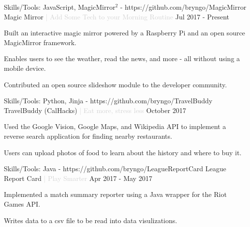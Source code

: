 

\begin{cventries}

  \cventry
  {Skills/Tools: JavaScript, MagicMirror$^2$ - https://github.com/bryngo/MagicMirror} %
  {Magic Mirror \textcolor{lightgray}{| Add Some Tech to your Morning Routine}} %
  {} %
  {Jul 2017 - Present} %
  {
  \begin{cvitems} %
    \item {Built an interactive magic mirror powered by a Raspberry Pi and an open source MagicMirror framework.}
    \item {Enables users to see the weather, read the news, and more - all without using a mobile device.}
    \item {Contributed an open source slideshow module to the developer community.}
  \end{cvitems}
  }

  \cventry
  {Skills/Tools: Python, Jinja - https://github.com/bryngo/TravelBuddy} %
  {TravelBuddy (CalHacks) \textcolor{lightgray}{| Eat more, stress less}} %
  {} %
  {October 2017} %
  {
  \begin{cvitems} %
    \item {Used the Google Vision, Google Maps, and Wikipedia API to implement a reverse search application for finding nearby restaurants.}
    \item {Users can upload photos of food to learn about the history and where to buy it.}
  \end{cvitems}
  }


  \cventry
  {Skills/Tools: Java - https://github.com/bryngo/LeagueReportCard} %
  {League Report Card \textcolor{lightgray}{| Play Smarter}} %
  {} %
  {Apr 2017 - May 2017} %
  {
  \begin{cvitems} %
    \item {Implemented a match summary reporter using a Java wrapper for the Riot Games API.}
    \item {Writes data to a csv file to be read into data visulizations.}
  \end{cvitems}
  }


\end{cventries}
